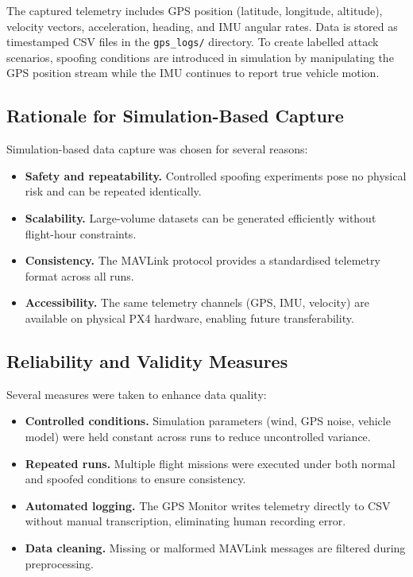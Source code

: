 \documentclass[11pt,a4paper]{article}
\begin{document}
The captured telemetry includes GPS position (latitude, longitude, altitude), velocity vectors, acceleration, heading, and IMU angular rates. Data is stored as timestamped CSV files in the \texttt{gps\_logs/} directory. To create labelled attack scenarios, spoofing conditions are introduced in simulation by manipulating the GPS position stream while the IMU continues to report true vehicle motion.

\subsection{Rationale for Simulation-Based Capture}

Simulation-based data capture was chosen for several reasons:
\begin{itemize}
    \item \textbf{Safety and repeatability.} Controlled spoofing experiments pose no physical risk and can be repeated identically.
    \item \textbf{Scalability.} Large-volume datasets can be generated efficiently without flight-hour constraints.
    \item \textbf{Consistency.} The MAVLink protocol provides a standardised telemetry format across all runs.
    \item \textbf{Accessibility.} The same telemetry channels (GPS, IMU, velocity) are available on physical PX4 hardware, enabling future transferability.
\end{itemize}

\subsection{Reliability and Validity Measures}

Several measures were taken to enhance data quality:
\begin{itemize}
    \item \textbf{Controlled conditions.} Simulation parameters (wind, GPS noise, vehicle model) were held constant across runs to reduce uncontrolled variance.
    \item \textbf{Repeated runs.} Multiple flight missions were executed under both normal and spoofed conditions to ensure consistency.
    \item \textbf{Automated logging.} The GPS Monitor writes telemetry directly to CSV without manual transcription, eliminating human recording error.
    \item \textbf{Data cleaning.} Missing or malformed MAVLink messages are filtered during preprocessing.
\end{itemize}
\end{document}
